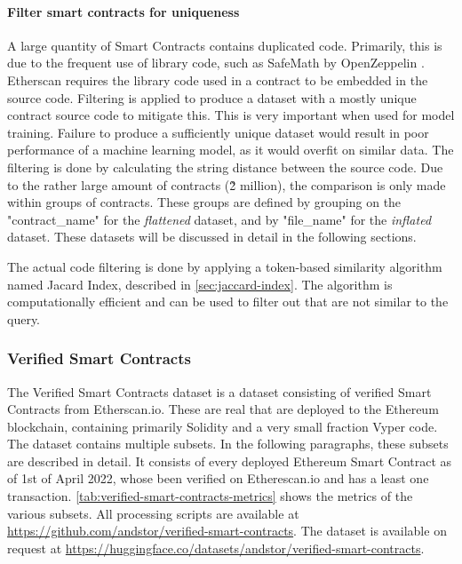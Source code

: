 \paragraph{Filter smart contracts for uniqueness}
\label{sec:duplication-filtering}
A large quantity of Smart Contracts contains duplicated code. Primarily, this is due to the frequent use of library code, such as SafeMath \cite{safemath} by OpenZeppelin \cite{openzeppelin}. Etherscan requires the library code used in a contract to be embedded in the source code. Filtering is applied to produce a dataset with a mostly unique contract source code to mitigate this. This is very important when used for model training. Failure to produce a sufficiently unique dataset would result in poor performance of a machine learning model, as it would overfit on similar data. The filtering is done by calculating the string distance between the source code. Due to the rather large amount of contracts (\~2 million), the comparison is only made within groups of contracts. These groups are defined by grouping on the "contract\_name" for the \textit{flattened} dataset, and by "file\_name" for the \textit{inflated} dataset. These datasets will be discussed in detail in the following sections.

The actual code filtering is done by applying a token-based similarity algorithm named Jacard Index, described in \cref{sec:jaccard-index}. The algorithm is computationally efficient and can be used to filter out  that are not similar to the query.

\subsubsection{Verified Smart Contracts}
\label{sec:verified-smart-contracts}
The Verified Smart Contracts dataset is a dataset consisting of verified Smart Contracts from Etherscan.io. These are real  that are deployed to the Ethereum blockchain, containing primarily Solidity and a very small fraction Vyper code. The dataset contains multiple subsets. In the following paragraphs, these subsets are described in detail. It consists of every deployed Ethereum Smart Contract as of 1st of April 2022, whose been verified on Etherescan.io and has a least one transaction. \cref{tab:verified-smart-contracts-metrics} shows the metrics of the various subsets. All processing scripts are available at \url{https://github.com/andstor/verified-smart-contracts}. The dataset is available on request at \url{https://huggingface.co/datasets/andstor/verified-smart-contracts}.

